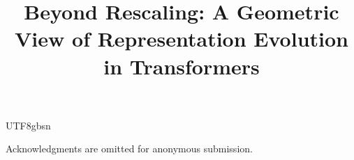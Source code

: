 \documentclass{article}
\title{Beyond Rescaling: A Geometric View of Representation Evolution in Transformers}
\author{%
}
\begin{document}
\begin{CJK*}{UTF8}{gbsn}

\maketitle













% 



\begin{ack}
Acknowledgments are omitted for anonymous submission.
\end{ack}




\newpage


\newpage


\end{CJK*}
\end{document}
